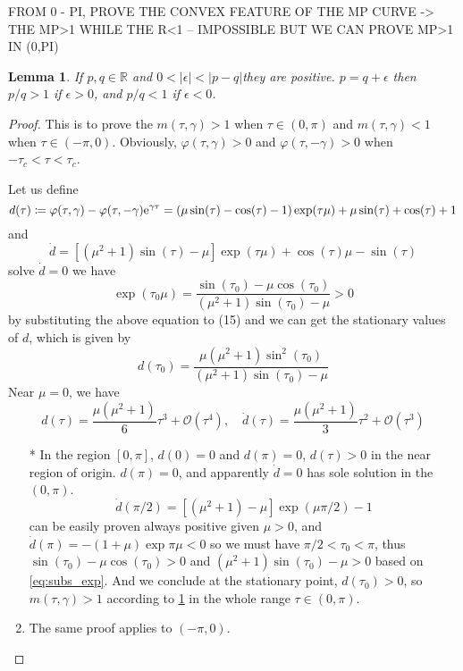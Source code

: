 \documentclass{article}
\newtheorem{lemma}[theorem]{Lemma}
\newtheorem{proof}{Proof}[theorem]
\begin{document}
FROM 0 - PI, PROVE THE CONVEX FEATURE OF THE MP CURVE -> THE MP>1 WHILE THE R<1 -- IMPOSSIBLE BUT WE CAN PROVE MP>1 IN (0,PI)
\begin{lemma}
	\label{lem:geq_unity_lema}
	If $p,q \in \mathbb{R}$ and $0<|\epsilon| < |p-q|$they are positive. $p = q + \epsilon$  then $p/q>1$ if $\epsilon>0$, and $p/q<1$ if $\epsilon<0$. 
\end{lemma}
\begin{proof}
	This is to prove the $m(\tau, \gamma) > 1 $ when $\tau \in (0, \pi)$ and $m(\tau, \gamma) < 1 $ when $\tau \in (-\pi,0)$.
	Obviously, $\varphi(\tau,\gamma)>0$ and $\varphi(\tau,-\gamma) > 0$ when $-\tau_c<\tau < \tau_c$. 
	
	Let us define 
	\begin{equation}
		d(\tau) \coloneq \varphi(\tau,\gamma) - \varphi(\tau,-\gamma) {\rm e}^{ \gamma \tau} = (\mu\sin(\tau) - \cos(\tau) - 1)\exp(\tau \mu) + \mu \sin(\tau) + \cos(\tau) + 1
	\end{equation}
and 
\begin{equation}
	\dot{d} = \left[ (\mu^2 +1) \sin(\tau) - \mu \right] \exp(\tau \mu) + \cos(\tau)\mu - \sin(\tau)
\end{equation}
solve $\dot{d} =0$ we have 
\begin{equation}
	\label{eq:subs_exp}
	\exp(\tau_0 \mu) = \frac{\sin(\tau_0) - \mu \cos(\tau_0)}{ (\mu^2 +1) \sin(\tau_0) - \mu } > 0
\end{equation}
by substituting the above equation to (15) and we can get the stationary values of $d$, which is given by 
\begin{equation}
	d(\tau_0) =\frac{\mu (\mu^2 + 1) \sin^2(\tau_0)}{ (\mu^2 +1) \sin(\tau_0) - \mu}
\end{equation}
Near $\mu =0$, we have 
$$
d(\tau) = \frac{\mu(\mu^2 + 1)}{6}\tau^3 + \mathcal{O}(\tau^4), \quad \dot{d}(\tau) = \frac{\mu(\mu^2 + 1)}{3}\tau^2 + \mathcal{O}(\tau^3)
$$
\begin{enumerate}
	\item[*] In the region $[0, \pi]$, $d(0) = 0$ and $d(\pi) =0$, $d(\tau) > 0$ in the near region of origin.
	$d(\pi) =0$,  and apparently $\dot{d} = 0$ has sole solution in the $(0, \pi)$.
	 $$ \dot{d}(\pi/2) = \left[ (\mu^2 +1)  - \mu \right] \exp(\mu\pi/2 )  - 1 $$
	  can be easily proven always positive given $\mu>0$,  and $\dot{d}(\pi)= -(1+\mu) \exp{\pi \mu} <0$ so we must have $\pi/2 < \tau_0 < \pi$, thus $\sin(\tau_0) - \mu \cos(\tau_0)>0$ and $(\mu^2 +1) \sin(\tau_0) - \mu >0$ 
	 based on \cref{eq:subs_exp}.  And we conclude at the stationary point, $d(\tau_0)>0$, so $m(\tau, \gamma) > 1 $ according to \cref{lem:geq_unity_lema} in the whole range $\tau \in (0, \pi)$. 
	 \item The same proof applies to $(-\pi,0)$.
\end{enumerate}

\end{proof}
\end{document}
